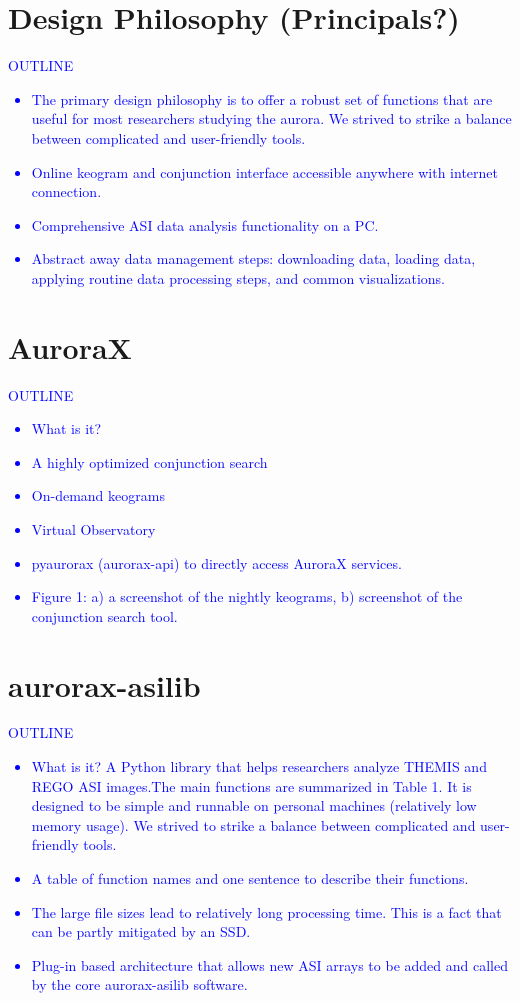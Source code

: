 \documentclass[draft]{agujournal2019}
\begin{document}
\section{Design Philosophy (Principals?)}
\textcolor{blue}{
      OUTLINE
      \begin{itemize}
            \item The primary design philosophy is to offer a robust set of functions that are useful for most researchers studying the aurora. We strived to strike a balance between complicated and user-friendly tools. 
            \item Online keogram and conjunction interface accessible anywhere with internet connection.
            \item Comprehensive ASI data analysis functionality on a PC.
            \item Abstract away data management steps: downloading data, loading data, applying routine data processing steps, and common visualizations.
      \end{itemize}
}

\section{AuroraX}\label{aurorax}
\textcolor{blue}{
      OUTLINE
      \begin{itemize}
            \item What is it?
            \item A highly optimized conjunction search
            \item On-demand keograms
            \item Virtual Observatory
            \item pyaurorax (aurorax-api) to directly access AuroraX services.
            \item Figure 1: a) a screenshot of the nightly keograms, b) screenshot of the conjunction search tool. 
      \end{itemize}
}

\section{aurorax-asilib}\label{aurorax-asilib}
\textcolor{blue}{
      OUTLINE
      \begin{itemize}
            \item What is it? A Python library that helps researchers analyze THEMIS and REGO ASI images.The main functions are summarized in Table 1. It is designed to be simple and runnable on personal machines (relatively low memory usage). We strived to strike a balance between complicated and user-friendly tools.
            \item A table of function names and one sentence to describe their functions.
            \item The large file sizes lead to relatively long processing time. This is a fact that can be partly mitigated by an SSD. 
            \item Plug-in based architecture that allows new ASI arrays to be added and called by the core aurorax-asilib software.
      \end{itemize}
}
\end{document}
